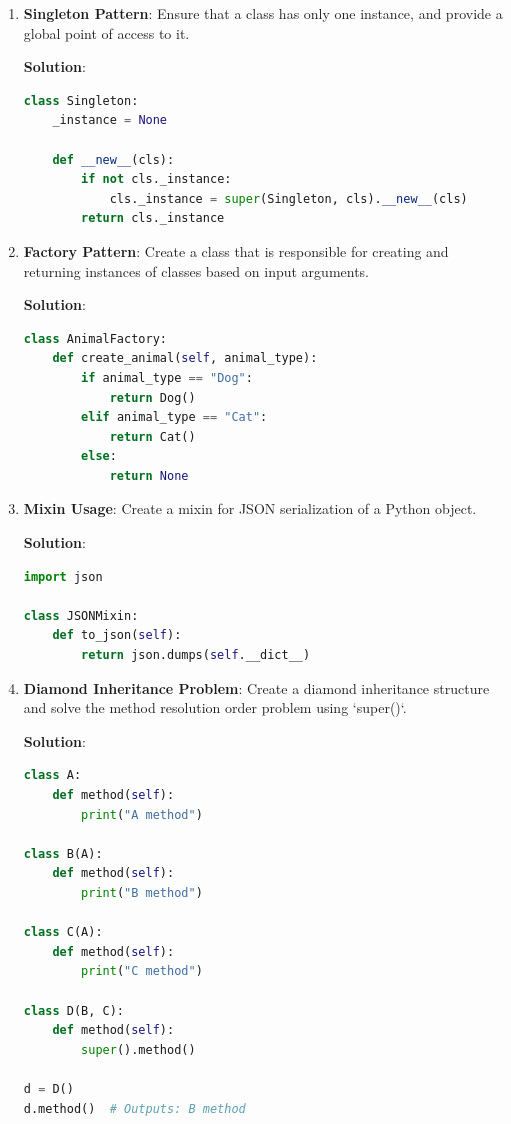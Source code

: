 \documentclass[12pt]{book}
\begin{document}
\begin{enumerate}
    \item \textbf{Singleton Pattern}: Ensure that a class has only one instance, and provide a global point of access to it.

    \textbf{Solution}:
    \begin{lstlisting}[language=Python]
class Singleton:
    _instance = None
    
    def __new__(cls):
        if not cls._instance:
            cls._instance = super(Singleton, cls).__new__(cls)
        return cls._instance
    \end{lstlisting}

    \item \textbf{Factory Pattern}: Create a class that is responsible for creating and returning instances of classes based on input arguments.

    \textbf{Solution}:
    \begin{lstlisting}[language=Python]
class AnimalFactory:
    def create_animal(self, animal_type):
        if animal_type == "Dog":
            return Dog()
        elif animal_type == "Cat":
            return Cat()
        else:
            return None
    \end{lstlisting}

    \item \textbf{Mixin Usage}: Create a mixin for JSON serialization of a Python object.

    \textbf{Solution}:
    \begin{lstlisting}[language=Python]
import json

class JSONMixin:
    def to_json(self):
        return json.dumps(self.__dict__)
    \end{lstlisting}

    \item \textbf{Diamond Inheritance Problem}: Create a diamond inheritance structure and solve the method resolution order problem using `super()`.

    \textbf{Solution}:
    \begin{lstlisting}[language=Python]
class A:
    def method(self):
        print("A method")

class B(A):
    def method(self):
        print("B method")

class C(A):
    def method(self):
        print("C method")

class D(B, C):
    def method(self):
        super().method()

d = D()
d.method()  # Outputs: B method
    \end{lstlisting}


\end{enumerate}
\end{document}
